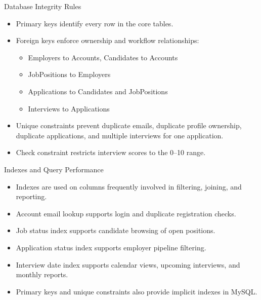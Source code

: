 \documentclass[aspectratio=169]{beamer}
\begin{document}
\begin{frame}{Database Integrity Rules}
  \begin{itemize}
    \item Primary keys identify every row in the core tables.
    \item Foreign keys enforce ownership and workflow relationships:
      \begin{itemize}
        \item Employers to Accounts, Candidates to Accounts
        \item JobPositions to Employers
        \item Applications to Candidates and JobPositions
        \item Interviews to Applications
      \end{itemize}
    \item Unique constraints prevent duplicate emails, duplicate profile ownership, duplicate applications, and multiple interviews for one application.
    \item Check constraint restricts interview scores to the 0--10 range.
  \end{itemize}
\end{frame}

\begin{frame}{Indexes and Query Performance}
  \begin{itemize}
    \item Indexes are used on columns frequently involved in filtering, joining, and reporting.
    \item Account email lookup supports login and duplicate registration checks.
    \item Job status index supports candidate browsing of open positions.
    \item Application status index supports employer pipeline filtering.
    \item Interview date index supports calendar views, upcoming interviews, and monthly reports.
    \item Primary keys and unique constraints also provide implicit indexes in MySQL.
  \end{itemize}
\end{frame}
\end{document}

